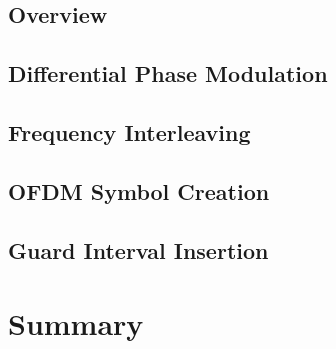 \documentclass[class=report,11pt,crop=false]{standalone}
\begin{document}
\subsection{Overview}
\subsection{Differential Phase Modulation}
\blindmathpaper
\subsection{Frequency Interleaving}
\blindmathpaper
\subsection{OFDM Symbol Creation}
\blindmathpaper
\subsection{Guard Interval Insertion}
\blindmathpaper

\section{Summary}
\blindtext

\ifstandalone

\printnoidxglossary[type=\acronymtype,nonumberlist]
\fi
\end{document}
